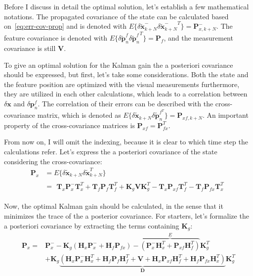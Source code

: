 Before I discuss in detail the optimal solution, let's establish a few mathematical notations. The propagated covariance of the state can be calculated based on~\eqref{eq:err-cov-prop} and is denoted with $E\{\delta\tilde{\mathbf{x}}_{k+N}^-{\delta\tilde{\mathbf{x}}_{k+N}^-}^T\}=\mathbf{P}_{x,k+N}^-$. The feature covariance is denoted with $E\{\delta \tilde{\mathbf{p}}_{n}^f {\delta\tilde{\mathbf{p}}_{n}^f}^T\}=\mathbf{P}_f$, and the measurement covariance is still $\mathbf{V}$. 

To give an optimal solution for the Kalman gain the a posteriori covariance should be expressed, but first, let's take some considerations. Both the state and the feature position are optimized with the visual measurements furthermore, they are utilized in each other calculations, which leads to a correlation between $\delta\mathbf{x}$ and $\delta\mathbf{p}_{n}^f$. The correlation of their errors can be described with the cross-covariance matrix, which is denoted as $E\{\delta\tilde{\mathbf{x}}_{k+N}\delta\tilde{\mathbf{p}}_n^{f^T}\}=\mathbf{P}_{xf,k+N}$. An important property of the cross-covariance matrices is $\mathbf{P}_{xf}=\mathbf{P}_{fx}^T$. 

From now on, I will omit the indexing, because it is clear to which time step the calculations refer. Let's express the a posteriori covariance of the state considering the cross-covariance:
\begin{equation}
\begin{aligned}
    \mathbf{P}_x &=E\{\delta\tilde{\mathbf{x}}_{k+N}\delta\tilde{\mathbf{x}}_{k+N}^T\} \\ &=
    \begin{aligned}
    \mathbf{T}_x\mathbf{P}_x^-\mathbf{T}_x^T+\mathbf{T}_f\mathbf{P}_f\mathbf{T}_f^T +
    \mathbf{K}_g\mathbf{V}\mathbf{K}_g^T - \mathbf{T}_x\mathbf{P}_{xf}\mathbf{T}_f^T - \mathbf{T}_f\mathbf{P}_{fx}\mathbf{T}_x^T
    \end{aligned}
\end{aligned}
\end{equation}

Now, the optimal Kalman gain should be calculated, in the sense that it minimizes the trace of the a posterior covariance. For starters, let's formalize the a posteriori covariance by extracting the terms containing $\mathbf{K}_g$:
\begin{equation}
\begin{aligned}
    \mathbf{P}_x =& \mathbf{P}_x^--\mathbf{K}_g\left(\mathbf{H}_{x}\mathbf{P}_{x}^-+\mathbf{H}_{f}\mathbf{P}_{fx}\right) -
    \overbrace{\left(\mathbf{P}_{x}^-\mathbf{H}_{x}^T + \mathbf{P}_{xf}\mathbf{H}_{f}^T\right)}^{E}\mathbf{K}_g^T \\ & +
    \mathbf{K}_g\underbrace{\left(\mathbf{H}_{x}\mathbf{P}_{x}^-\mathbf{H}_{x}^T +\mathbf{H}_{f}\mathbf{P}_f\mathbf{H}_{f}^T+\mathbf{V} + \mathbf{H}_{x}\mathbf{P}_{xf}\mathbf{H}_f^T+\mathbf{H}_{f}\mathbf{P}_{fx}\mathbf{H}_x^T\right)}_{\mathbf{D}}\mathbf{K}_g^T
\end{aligned}
\end{equation}

